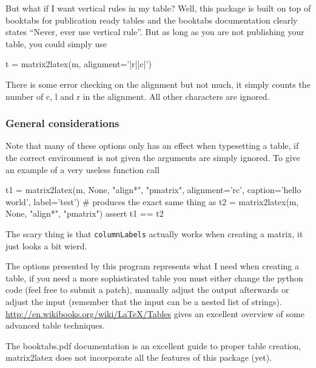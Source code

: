 But what if I want vertical rules in my table? Well, this package is built
on top of booktabs for publication ready tables and the booktabs documentation clearly
states ``Never, ever use vertical rule''. But as long as you are not publishing your table,
you could simply use
\begin{sageblock}
t = matrix2latex(m, alignment='|r||c|')
\end{sageblock}

There is some error checking on the alignment but not much, it simply counts the number
of c, l and r in the alignment. All other characters are ignored.

\subsubsection{General considerations}
Note that many of these options only has an effect when typesetting a table,
if the correct environment is not given the arguments are simply ignored.
To give an example of a very useless function call
\begin{sageblock}
t1 = matrix2latex(m, None, "align*", "pmatrix",
                 alignment='rc',
                 caption='hello world',
                 label='test')
# produces the exact same thing as
t2 = matrix2latex(m, None, "align*", "pmatrix")
assert t1 == t2
\end{sageblock}
The scary thing is that \lstinline{columnLabels} actually works when creating a matrix,
it just looks a bit wierd.

The options presented by this program represents what I need when creating a table,
if you need a more sophisticated table you must either change the python code
(feel free to submit a patch), manually adjust the output afterwards
or adjust the input (remember that the input can be a nested list of strings).
\url{http://en.wikibooks.org/wiki/LaTeX/Tables} gives an excellent overview
of some advanced table techniques.

The booktabs.pdf documentation is an excellent guide to proper table creation,
matrix2latex does not incorporate all the features of this package (yet).

